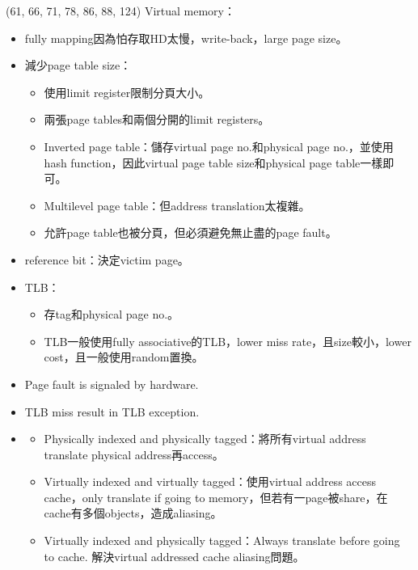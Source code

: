 \item \begin{theorem}{(61, 66, 71, 78, 86, 88, 124)} Virtual memory：\begin{itemize}
        \item fully mapping因為怕存取HD太慢，write-back，large page size。
        \item 減少page table size：\begin{itemize}
            \item 使用limit register限制分頁大小。
            \item 兩張page tables和兩個分開的limit registers。
            \item Inverted page table：儲存virtual page no.和physical page no.，並使用hash function，因此virtual page table size和physical page table一樣即可。
            \item Multilevel page table：但address translation太複雜。
            \item 允許page table也被分頁，但必須避免無止盡的page fault。
        \end{itemize}
        \item reference bit：決定victim page。
        \item TLB：\begin{itemize}
            \item 存tag和physical page no.。
            \item TLB一般使用fully associative的TLB，lower miss rate，且size較小，lower cost，且一般使用random置換。
        \end{itemize}
        \item Page fault is signaled by hardware.
        \item TLB miss result in TLB exception.
        \item \quad\quad \begin{itemize}
            \item Physically indexed and physically tagged：將所有virtual address translate physical address再access。
            \item Virtually indexed and virtually tagged：使用virtual address access cache，only translate if going to memory，但若有一page被share，在cache有多個objects，造成aliasing。
            \item Virtually indexed and physically tagged：Always translate before going to cache. 解決virtual addressed cache aliasing問題。
        \end{itemize}
        \begin{figure}[H]

\end{figure}
\end{itemize}
\end{theorem}
